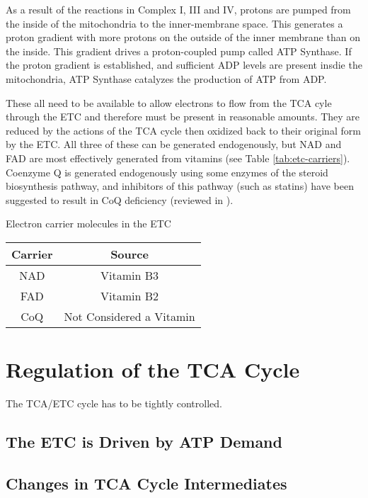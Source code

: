 \documentclass{tufte-handout}
\begin{document}
As a result of the reactions in Complex I, III and IV, protons are pumped from the inside of the mitochondria to the inner-membrane space.  This generates a proton gradient with more protons on the outside of the inner membrane than on the inside.  This gradient drives a proton-coupled pump called ATP Synthase.  If the proton gradient is established, and sufficient ADP levels are present insdie the mitochondria, ATP Synthase catalyzes the production of ATP from ADP.

 These all need to be available to allow electrons to flow from the TCA cyle through the ETC and therefore must be present in reasonable amounts.  They are reduced by the actions of the TCA cycle then oxidized back to their original form by the ETC.  All three of these can be generated endogenously, but NAD and FAD are most effectively generated from vitamins (see Table \ref{tab:etc-carriers}).  Coenzyme Q is generated endogenously using some enzymes of the steroid biosynthesis pathway, and inhibitors of this pathway (such as statins) have been suggested to result in CoQ deficiency (reviewed in \citet{Quinzii2007}).

\begin{margintable}
\centering
\caption{Electron carrier molecules in the ETC}
\label{tab:etc-carriers}
\begin{tabular}{cc}
\hline
\textbf {Carrier} & \textbf{Source}\\
\hline
NAD & Vitamin B3 \\
FAD & Vitamin B2  \\
CoQ & Not Considered a Vitamin \\
\hline
\end{tabular}
\end{margintable}


\section{Regulation of the TCA Cycle}

The TCA/ETC cycle has to be tightly controlled.  

\subsection{The ETC is Driven by ATP Demand}

\subsection{Changes in TCA Cycle Intermediates}
\end{document}
